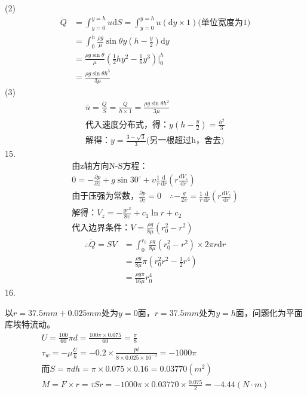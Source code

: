 \documentclass[a4paper,fleqn,twocolumn]{article}
\newcommand{\di}[1]{\mathrm{d}#1}
\newcommand{\p}[2]{\frac{\partial #1}{\partial #2}}
\newcommand{\dy}[2]{\frac{\di{#1}}{\di{#2}}}
\begin{document}
	(2)
	\begin{align*}
		\dot{Q}	&=\int_{y=0}^{y=h}u\mathrm{d}S=\int_{y=0}^{y=h}u(\mathrm{d}y\times 1)\text{(单位宽度为1)}\\
				&=\int_{0}^{h}\frac{\rho g}{\mu}\sin\theta y\left(h-\frac{y}{2}\right)\mathrm{d}y\\
				&=\frac{\rho g\sin\theta}{\mu}\left(\frac{1}{2}hy^2-\frac{1}{6}y^3\right)\left.\right|_0^h\\
				&=\frac{\rho g\sin\theta h^3}{3\mu}
	\end{align*}
	(3)
	\begin{gather*}
		\bar{u}=\frac{\dot{Q}}{S}=\frac{\dot{Q}}{h\times 1}=\frac{\rho g\sin\theta h^2}{3\mu}\\
		\text{代入速度分布式，得：}y\left(h-\frac{y}{2}\right)=\frac{h^2}{3}\\
		\text{解得：}y=\frac{3-\sqrt{3}}{3}\text{(另一根超过h，舍去)}
	\end{gather*}
	15.
	\begin{gather*}
		\text{由z轴方向N-S方程：}\\
		0=-\p{p}{z}+g\sin30^\circ+\upsilon\frac{1}{r}\frac{\di{}}{\di{r}}\left(r\dy{V_z}{r}\right)\\
		\text{由于压强为常数，}\p{p}{z}=0\quad \therefore -\frac{g}{2\upsilon}=\frac{1}{r}\frac{\di{}}{\di{r}}\left(r\dy{V_z}{r}\right)\\
		\text{解得：}V_z=-\frac{gr^2}{8\upsilon}+c_1\ln r+c_2\\
		\text{代入边界条件：}V=\frac{\rho g}{8\mu}(r_0^2-r^2)
	\end{gather*}
	\begin{align*}
		\therefore \dot{Q}=SV	&=\int_{0}^{r_0}\frac{\rho g}{8\mu}(r_0^2-r^2)\times 2\pi r\di{r}\\
								&=\frac{\rho g}{8\mu}\pi\left(r_0^2r^2-\frac{1}{2}r^4\right)\\
								&=\frac{\rho g\pi}{16\mu}r_0^4
	\end{align*}
	16.\par 
	以$r=37.5mm+0.025mm$处为$y=0$面，$r=37.5mm$处为$y=h$面，问题化为平面库埃特流动。\\
	\begin{gather*}
		U=\frac{100}{60}\pi d=\frac{100\pi\times 0.075}{60}=\frac{\pi}{8}\\
		\tau_w=-\mu\frac{U}{h}=-0.2\times\frac{pi}{8\times0.025\times10^{-3}}=-1000\pi\\
		\text{而}S=\pi dh=\pi\times0.075\times0.16=0.03770(m^2)\\
		M=F\times r=\tau Sr=-1000\pi\times0.03770\times\frac{0.075}{2}=-4.44(N\cdot m)
	\end{gather*}
\end{document}
